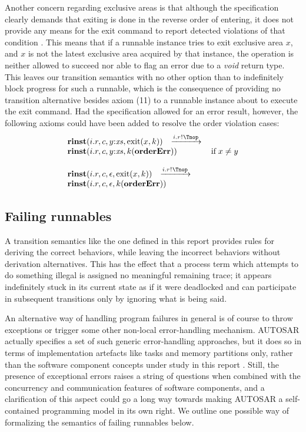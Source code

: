 \documentclass[twocolumn]{article}
\begin{document}
Another concern regarding exclusive areas is that although the specification clearly demands that exiting is done in the reverse order of entering, it does not provide any means for the exit command to report detected violations of that condition \cite[ch.~5.6.29]{AR:RTE}. This means that if a runnable instance tries to exit exclusive area $x$, and $x$ is not the latest exclusive area acquired by that instance, the operation is neither allowed to succeed nor able to flag an error due to a \emph{void} return type. This leaves our transition semantics with no other option than to indefinitely block progress for such a runnable, which is the consequence of providing no transition alternative besides axiom (11) to a runnable instance about to execute the exit command. Had the specification allowed for an error result, however, the following axioms could have been added to resolve the order violation cases:
$$
\begin{array}{lcll}
		{\Trinst {i.r} c {\Tcons y \Xs} {\TrteExit x k}}
		\;\; \red{\Tsay {i.r} \Tnop} \\
		{\Trinst {i.r} c {\Tcons y \Xs} {\Tap k {\kw{orderErr}}}}
		& \Pif\;x \neq y
\\ \\
		{\Trinst {i.r} c \Teps {\TrteExit x k}}
		\;\; \red{\Tsay {i.r} \Tnop} \\
		{\Trinst {i.r} c \Teps {\Tap k {\kw{orderErr}}}}

\end{array}
$$


\subsection{Failing runnables}

A transition semantics like the one defined in this report provides rules for deriving the correct behaviors, while leaving the incorrect behaviors without derivation alternatives. This has the effect that a process term which attempts to do something illegal is assigned no meaningful remaining trace; it appears indefinitely stuck in its current state as if it were deadlocked and can participate in subsequent transitions only by ignoring what is being said.

An alternative way of handling program failures in general is of course to throw exceptions or trigger some other non-local error-handling mechanism. AUTOSAR actually specifies a set of such generic error-handling approaches, but it does so in terms of implementation artefacts like tasks and memory partitions only, rather than the software component concepts under study in this report \cite{AR:ERR}. Still, the presence of exceptional errors raises a string of questions when combined with the concurrency and communication features of software components, and a clarification of this aspect could go a long way towards making AUTOSAR a self-contained programming model in its own right. We outline one possible way of formalizing the semantics of failing runnables below.
\end{document}
